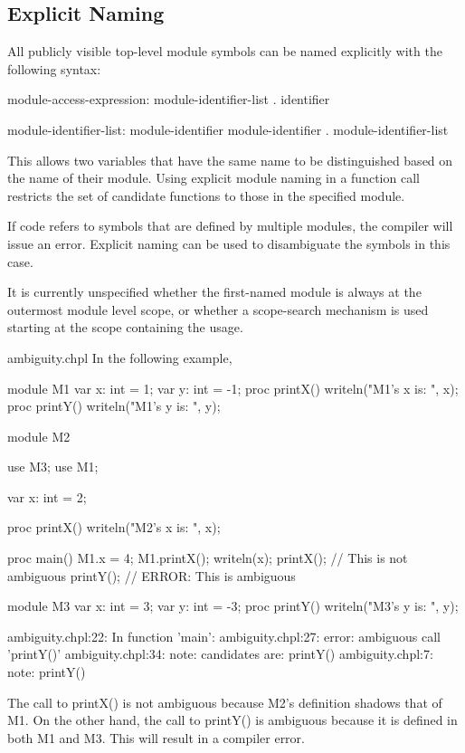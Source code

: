 \subsection{Explicit Naming}
\label{Explicit_Naming}

All publicly visible top-level module symbols can be named explicitly
with the following syntax:
\begin{syntax}
module-access-expression:
  module-identifier-list . identifier

module-identifier-list:
  module-identifier
  module-identifier . module-identifier-list

\end{syntax}
This allows two variables that have the same name to be distinguished
based on the name of their module.  Using explicit module naming in a
function call restricts the set of candidate functions to those in the
specified module.

If code refers to symbols that are defined by multiple modules, the
compiler will issue an error.  Explicit naming can be used to
disambiguate the symbols in this case.

\begin{openissue}
It is currently unspecified whether the
first-named module is always at the outermost module level scope, or whether a
scope-search mechanism is used starting at the scope containing the
usage.
\end{openissue}

\begin{chapelexample}{ambiguity.chpl}
In the following example,
\begin{chapel}
module M1 {
  var x: int = 1;
  var y: int = -1;
  proc printX() {
    writeln("M1's x is: ", x);
  }
  proc printY() {
    writeln("M1's y is: ", y);
  }
}
 
module M2 {
  use M3;
  use M1;

  var x: int = 2;

  proc printX() {
    writeln("M2's x is: ", x);
  }

  proc main() {
    M1.x = 4;
    M1.printX();
    writeln(x);
    printX(); // This is not ambiguous
    printY(); // ERROR: This is ambiguous
  }
}

module M3 {
  var x: int = 3;
  var y: int = -3;
  proc printY() {
    writeln("M3's y is: ", y);
  }
}
\end{chapel}
\begin{chapeloutput}
ambiguity.chpl:22: In function 'main':
ambiguity.chpl:27: error: ambiguous call 'printY()'
ambiguity.chpl:34: note: candidates are: printY()
ambiguity.chpl:7: note:                 printY()
\end{chapeloutput}
The call to printX() is not ambiguous because M2's definition shadows
that of M1.  On the other hand, the call to printY() is ambiguous
because it is defined in both M1 and M3.  This will result in a
compiler error.
\end{chapelexample}

